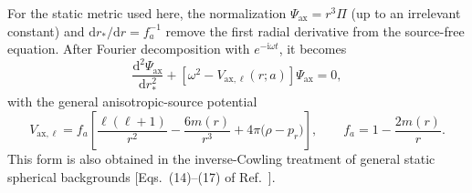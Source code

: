 \documentclass[12pt,a4paper]{article}
\newcommand{\dd}{\mathrm{d}}
\newcommand{\ii}{\mathrm{i}}
\begin{document}
For the static metric used here, the normalization
\(\Psi_{\mathrm{ax}}=r^3\Pi\) (up to an irrelevant constant) and
\(\dd r_*/\dd r=f_a^{-1}\) remove the first radial derivative from the
source-free equation.  After Fourier decomposition with
\(e^{-\ii\omega t}\), it becomes
\begin{equation}
\frac{\dd^2\Psi_{\mathrm{ax}}}{\dd r_*^2}
+\left[\omega^2-V_{\mathrm{ax},\ell}(r;a)\right]\Psi_{\mathrm{ax}}=0,
\label{eq:axialmaster}
\end{equation}
with the general anisotropic-source potential
\begin{equation}
V_{\mathrm{ax},\ell}
=f_a\left[
\frac{\ell(\ell+1)}{r^2}-\frac{6m(r)}{r^3}
+4\pi\bigl(\rho-p_r\bigr)\right],
\qquad
f_a=1-\frac{2m(r)}{r}.
\label{eq:axialmatterpotential}
\end{equation}
This form is also obtained in the inverse-Cowling treatment of general static
spherical backgrounds [Eqs.~(14)--(17) of Ref.~\cite{Boonserm2013}].
\end{document}
